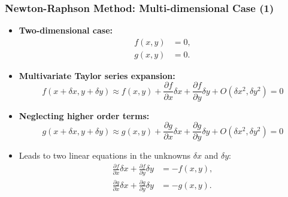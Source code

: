 \begin{frame}[fragile]
    \frametitle{Newton-Raphson Method: Multi-dimensional Case (1)}

    \begin{itemize}
        \item \textbf{Two-dimensional case:}
        \begin{align*}
            f(x, y) &= 0, \\
            g(x, y) &= 0.
        \end{align*}
        
        \item \textbf{Multivariate Taylor series expansion:}
        \[
            f(x + \delta x, y + \delta y) \approx f(x, y) + \frac{\partial f}{\partial x} \delta x + \frac{\partial f}{\partial y} \delta y + O(\delta x^2, \delta y^2) = 0
        \]
        
        \item \textbf{Neglecting higher order terms:}
        \[
            g(x + \delta x, y + \delta y) \approx g(x, y) + \frac{\partial g}{\partial x} \delta x + \frac{\partial g}{\partial y} \delta y + O(\delta x^2, \delta y^2) = 0
        \]
        
        \item Leads to two linear equations in the unknowns \(\delta x\) and \(\delta y\):
        \begin{align*}
            \frac{\partial f}{\partial x} \delta x + \frac{\partial f}{\partial y} \delta y &= -f(x, y), \\
            \frac{\partial g}{\partial x} \delta x + \frac{\partial g}{\partial y} \delta y &= -g(x, y).
        \end{align*}
    \end{itemize}
\end{frame}

